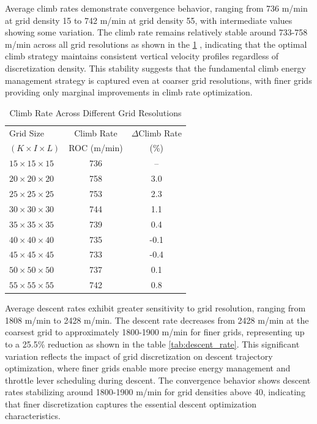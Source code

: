 Average climb rates demonstrate convergence behavior, ranging from 736 m/min at grid density 15 to 742 m/min at grid density 55, with intermediate values showing some variation. The climb rate remains relatively stable around 733-758 m/min across all grid resolutions as shown in the \ref{tab:climb_rate} , indicating that the optimal climb strategy maintains consistent vertical velocity profiles regardless of discretization density. This stability suggests that the fundamental climb energy management strategy is captured even at coarser grid resolutions, with finer grids providing only marginal improvements in climb rate optimization.

\begin{table}[h]
    \centering
    \footnotesize
    \begin{tabular}{l c c}
        \hline
        Grid Size & Climb Rate & $\Delta$Climb Rate \\
        $(K \times I \times L)$ & ROC (m/min) & (\%) \\
        \hline
        $15 \times 15 \times 15$ & 736 & -- \\
        $20 \times 20 \times 20$ & 758 & 3.0 \\
        $25 \times 25 \times 25$ & 753 & 2.3 \\
        $30 \times 30 \times 30$ & 744 & 1.1 \\
        $35 \times 35 \times 35$ & 739 & 0.4 \\
        $40 \times 40 \times 40$ & 735 & -0.1 \\
        $45 \times 45 \times 45$ & 733 & -0.4 \\
        $50 \times 50 \times 50$ & 737 & 0.1 \\
        $55 \times 55 \times 55$ & 742 & 0.8 \\
        \hline
    \end{tabular}
    \caption{Climb Rate Across Different Grid Resolutions}
    \label{tab:climb_rate}
\end{table}

Average descent rates exhibit greater sensitivity to grid resolution, ranging from 1808 m/min to 2428 m/min. The descent rate decreases from 2428 m/min at the coarsest grid to approximately 1800-1900 m/min for finer grids, representing up to a 25.5\% reduction as shown in the table \ref{tab:descent_rate}. This significant variation reflects the impact of grid discretization on descent trajectory optimization, where finer grids enable more precise energy management and throttle lever scheduling during descent. The convergence behavior shows descent rates stabilizing around 1800-1900 m/min for grid densities above 40, indicating that finer discretization captures the essential descent optimization characteristics.

